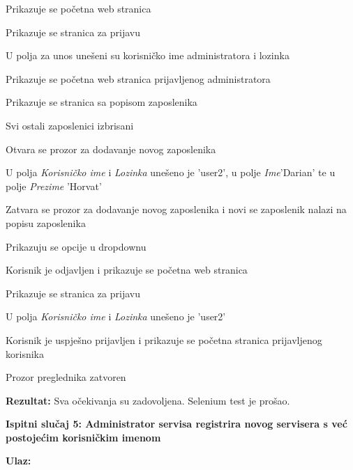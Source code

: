 			\begin{packed_enum}
				
				\item Prikazuje se početna web stranica
				\item Prikazuje se stranica za prijavu
				\item U polja za unos unešeni su korisničko ime administratora i lozinka
				\item Prikazuje se početna web stranica prijavljenog administratora
				\item Prikazuje se stranica sa popisom zaposlenika
				\item Svi ostali zaposlenici izbrisani
				\item Otvara se prozor za dodavanje novog zaposlenika
				\item U polja \textit{Korisničko ime} i \textit{Lozinka} unešeno je 'user2', u polje \textit{Ime}'Darian' te u polje \textit{Prezime} 'Horvat'
				\item Zatvara se prozor za dodavanje novog zaposlenika i novi se zaposlenik nalazi na popisu zaposlenika
				\item Prikazuju se opcije u dropdownu
				\item Korisnik je odjavljen i prikazuje se početna web stranica
				\item Prikazuje se stranica za prijavu
				\item U polja \textit{Korisničko ime} i \textit{Lozinka} unešeno je 'user2'
				\item Korisnik je uspješno prijavljen i prikazuje se početna stranica prijavljenog korisnika
				\item Prozor preglednika zatvoren
				
			\end{packed_enum}
			
			\noindent\textbf{Rezultat:} Sva očekivanja su zadovoljena. Selenium test je prošao.
			
			\hfill\break
			\noindent\textbf{Ispitni slučaj 5: Administrator servisa registrira novog servisera s već postojećim korisničkim imenom}
			
			\hfill\break
			\noindent\textbf{Ulaz:}
			
